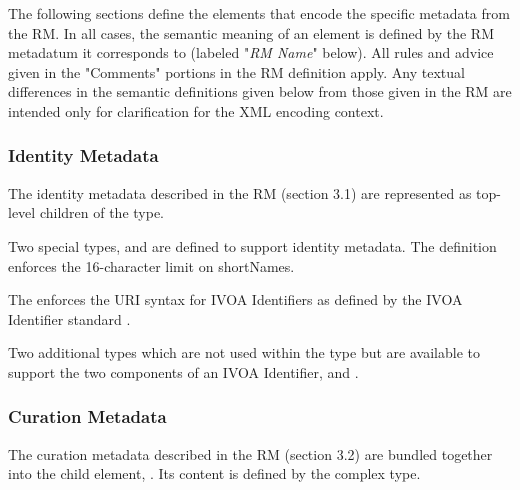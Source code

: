 \documentclass[11pt,a4paper]{ivoa}
\begin{document}
The following sections define the elements that encode the specific
metadata from the RM.  In all cases, the semantic meaning of an element
is defined by the RM metadatum it corresponds to (labeled "\emph{RM
Name}" below).  All rules and advice given in the "Comments" portions in
the RM definition apply.  Any textual differences in the semantic
definitions given below from those given in the RM are intended only for
clarification for the XML encoding context.  


\subsubsection{Identity Metadata}


The identity metadata described in the RM (section
3.1) are represented as top-level children of the
 type.


Two special types,  and
 are defined to support identity
metadata.  The  definition enforces the
16-character limit on shortNames.  




The  enforces the URI syntax for IVOA
Identifiers as defined by the IVOA Identifier standard
\citep{std:Identifiers}.




Two additional types which are not used within the
 type but are available to support the two
components of an IVOA Identifier,
 and .  






\subsubsection{Curation Metadata}


The curation metadata described in the RM (section
3.2) are bundled together into the  child element,
.  Its content is defined by the
 complex type.
\end{document}
